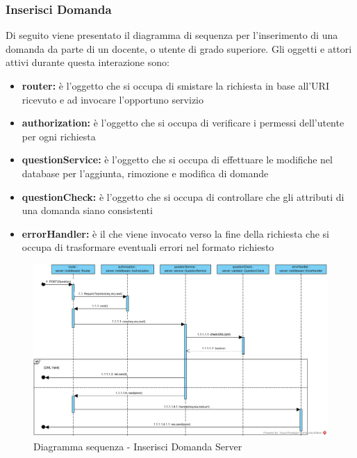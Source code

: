 \documentclass[12pt,a4paper]{article}
\begin{document}
\newpage
\subsubsection{Inserisci Domanda}
Di seguito viene presentato il diagramma di sequenza per l'inserimento di una domanda da parte di un docente, o utente di grado superiore. Gli oggetti e attori attivi durante questa interazione sono:

\begin{itemize}
	\item \textbf{router:} è l'oggetto che si occupa di smistare la richiesta in base all’URI ricevuto e ad invocare l’opportuno servizio
	\item \textbf{authorization:} è l'oggetto che si occupa di verificare i permessi dell'utente per ogni richiesta	
	\item \textbf{questionService:} è l'oggetto che si occupa di effettuare le modifiche nel database per l'aggiunta, rimozione e modifica di domande
	\item \textbf{questionCheck:} è l'oggetto che si occupa di controllare che gli attributi di una domanda siano consistenti
	\item \textbf{errorHandler:} è il  che viene invocato verso la fine della richiesta che si occupa di trasformare eventuali errori nel formato  richiesto
\end{itemize}

\begin{center}
	\begin{figure}[H]
		\centering \includegraphics[max width=\myheight, angle=90]{../img/diagrammiSequenza/inserisciDomandaServer.png}
		\caption{Diagramma sequenza - Inserisci Domanda Server}
	\end{figure}
\end{center}
\end{document}
